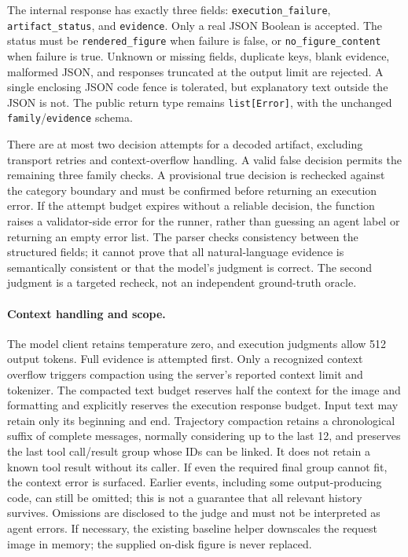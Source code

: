 \documentclass[11pt]{article}
\begin{document}
The internal response has exactly three fields:
\texttt{execution\_failure}, \texttt{artifact\_status}, and \texttt{evidence}.
Only a real JSON Boolean is accepted. The status must be
\texttt{rendered\_figure} when failure is false, or
\texttt{no\_figure\_content} when failure is true.
Unknown or missing fields, duplicate keys, blank evidence, malformed JSON,
and responses truncated at the output limit are rejected.
A single enclosing JSON code fence is tolerated, but explanatory text outside
the JSON is not. The public return type remains \texttt{list[Error]}, with the
unchanged \texttt{family}/\texttt{evidence} schema.

There are at most two decision attempts for a decoded artifact, excluding
transport retries and context-overflow handling. A valid false decision
permits the remaining three family checks. A provisional true decision is
rechecked against the category boundary and must be confirmed before returning
an execution error. If the attempt budget expires without a reliable decision,
the function raises a validator-side error for the runner, rather than
guessing an agent label or returning an empty error list.
The parser checks consistency between the structured fields; it cannot prove
that all natural-language evidence is semantically consistent or that the
model's judgment is correct. The second judgment is a targeted recheck, not an
independent ground-truth oracle.

\paragraph{Context handling and scope.}
The model client retains temperature zero, and execution judgments allow
512 output tokens. Full evidence is attempted first. Only a recognized context
overflow triggers compaction using the server's reported context limit and
tokenizer. The compacted text budget reserves half the context for the image
and formatting and explicitly reserves the execution response budget.
Input text may retain only its beginning and end. Trajectory compaction retains
a chronological suffix of complete messages, normally considering up to the
last 12, and preserves the last tool call/result group whose IDs can be linked.
It does not retain a known tool result without its caller. If even the required
final group cannot fit, the context error is surfaced.
Earlier events, including some output-producing code, can still be omitted;
this is not a guarantee that all relevant history survives.
Omissions are disclosed to the judge and must not be interpreted as agent errors.
If necessary, the existing baseline helper downscales the request image
in memory; the supplied on-disk figure is never replaced.
\end{document}
